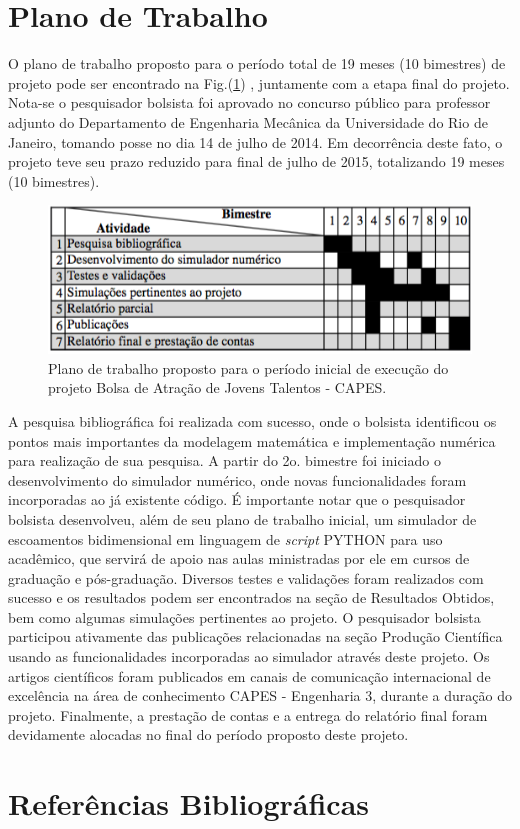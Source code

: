 \documentclass[a4paper,portuges,12pt]{article}
\begin{document}
\section{Plano de Trabalho}

O plano de trabalho proposto para o período total de 19 meses (10
bimestres) de projeto pode ser encontrado na Fig.(\ref{fig:plano}) ,
juntamente com a etapa final do projeto. Nota-se o pesquisador bolsista
foi aprovado no concurso público para professor adjunto do Departamento
de Engenharia Mecânica da Universidade do Rio de Janeiro, tomando posse
no dia 14 de julho de 2014. Em decorrência deste fato, o projeto teve
seu prazo reduzido para final de julho de 2015, totalizando 19 meses (10
bimestres). 

 \begin{figure}[ht!]
 	\begin{center}
 		\includegraphics[angle=0, scale=0.75]{figs/plano.png}
 	\end{center}
 	\caption{Plano de trabalho proposto para o período inicial de
	execução do projeto Bolsa de Atração de Jovens Talentos - CAPES.}
 	\label{fig:plano} 
 \end{figure}

A pesquisa bibliográfica foi realizada com sucesso, onde o bolsista
identificou os pontos mais importantes da modelagem matemática e
implementação numérica para realização de sua pesquisa. A partir do 2o.
bimestre foi iniciado o desenvolvimento do simulador numérico, onde
novas funcionalidades foram incorporadas ao já existente código. É
importante notar que o pesquisador bolsista desenvolveu, além de seu
plano de trabalho inicial, um simulador de escoamentos bidimensional em
linguagem de \textit{script} PYTHON para uso acadêmico, que servirá de apoio nas
aulas ministradas por ele em cursos de graduação e pós-graduação.
Diversos testes e validações foram realizados com sucesso e os
resultados podem ser encontrados na seção de Resultados Obtidos, bem
como algumas simulações pertinentes ao projeto. O pesquisador bolsista
participou ativamente das publicações relacionadas na seção Produção
Científica usando as funcionalidades incorporadas ao simulador através
deste projeto. Os artigos científicos foram publicados em canais de
comunicação internacional de excelência na área de conhecimento CAPES -
Engenharia 3, durante a duração do projeto. Finalmente, a prestação de
contas e a entrega do relatório final foram devidamente alocadas no
final do período proposto deste projeto.  

\section{Referências Bibliográficas}


\end{document}
